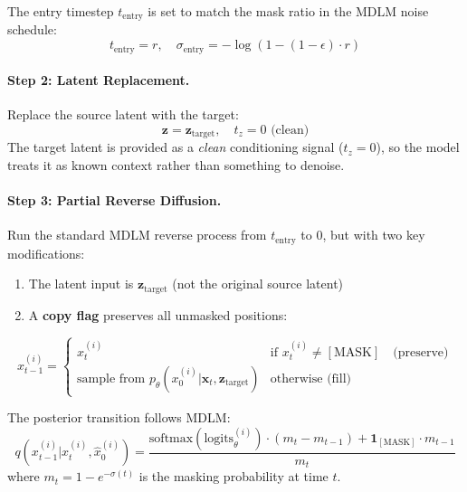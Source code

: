\documentclass{article}
\begin{document}
The entry timestep $t_\text{entry}$ is set to match the mask ratio in the MDLM noise schedule:
\begin{equation}
    t_\text{entry} = r, \quad \sigma_\text{entry} = -\log(1 - (1-\epsilon) \cdot r)
\end{equation}

\paragraph{Step 2: Latent Replacement.}
Replace the source latent with the target:
\begin{equation}
    \mathbf{z} = \mathbf{z}_\text{target}, \quad t_z = 0 \text{ (clean)}
\end{equation}
The target latent is provided as a \emph{clean} conditioning signal ($t_z = 0$), so the model treats it as known context rather than something to denoise.

\paragraph{Step 3: Partial Reverse Diffusion.}
Run the standard MDLM reverse process from $t_\text{entry}$ to $0$, but with two key modifications:
\begin{enumerate}
    \item The latent input is $\mathbf{z}_\text{target}$ (not the original source latent)
    \item A \textbf{copy flag} preserves all unmasked positions:
\end{enumerate}
\begin{equation}
    x_{t-1}^{(i)} = \begin{cases}
        x_t^{(i)} & \text{if } x_t^{(i)} \neq [\text{MASK}] \quad \text{(preserve)} \\
        \text{sample from } p_\theta(x_0^{(i)} | \mathbf{x}_t, \mathbf{z}_\text{target}) & \text{otherwise (fill)}
    \end{cases}
\end{equation}

The posterior transition follows MDLM:
\begin{equation}
    q(x_{t-1}^{(i)} | x_t^{(i)}, \hat{x}_0^{(i)}) =
    \frac{\text{softmax}(\text{logits}_\theta^{(i)}) \cdot (m_t - m_{t-1}) + \mathbf{1}_{[\text{MASK}]} \cdot m_{t-1}}{m_t}
\end{equation}
where $m_t = 1 - e^{-\sigma(t)}$ is the masking probability at time $t$.
\end{document}
